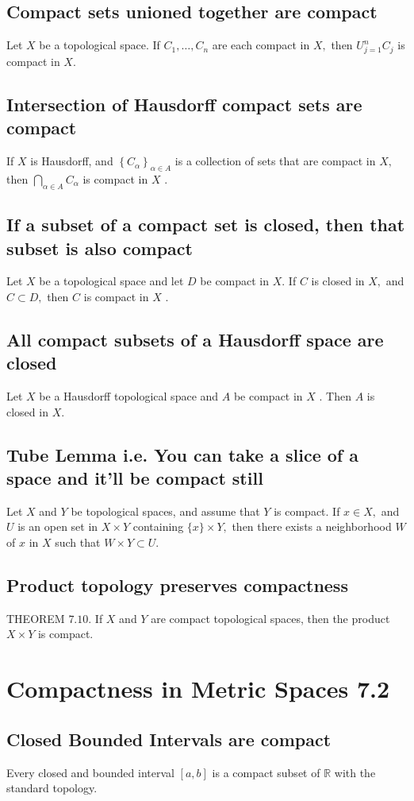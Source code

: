 \documentclass[12pt]{article}
\begin{document}
	\subsection{Compact sets unioned together are compact}
		Let $ X $ be a topological space. If $C _ { 1 } , \ldots , C _ { n }$ are each compact in $X ,$ then $U _ { j = 1 } ^ { n } C _ { j }$ is compact	in $X .$
	\subsection{Intersection of Hausdorff compact sets are compact}
		If $X$ is Hausdorff, and $\left\{ C _ { \alpha } \right\} _ { \alpha \in A }$ is a collection of sets that are	compact in $X ,$ then $\bigcap _ { \alpha \in A } C _ { \alpha }$ is compact in $X$ .
	\subsection{If a subset of a compact set is closed, then that subset is also compact}
		Let $X$ be a topological space and let $D$ be compact in $X $. If $C$ is closed in $X ,$ and $C \subset D ,$ then $C$ is compact in $X$ .
	\subsection{All compact subsets of a Hausdorff space are closed}
	 	Let $X$ be a Hausdorff topological space and $A$ be compact in $X$ . Then $A$ is closed in $X .$
	 \subsection{Tube Lemma i.e. You can take a slice of a space and it'll be compact still}
		 Let $X$ and $Y$ be topological spaces, and assume that $Y$ is compact. If $x \in X ,$ and $U$ is an open set in $X \times Y$ containing $\{ x \} \times Y ,$ then there exists a neighborhood $W$ of $x$ in $X$ such that $W \times Y \subset U$.
	\subsection{Product topology preserves compactness}
		THEOREM $7.10 .$ If $X$ and $Y$ are compact topological spaces, then the product $X \times Y$ is compact.
	\setcounter{section}{6}
\section{Compactness in Metric Spaces 7.2}
	\subsection{Closed Bounded Intervals are compact}
		Every closed and bounded interval $[ a , b ]$ is a compact subset of $\mathbb { R }$ with the standard topology.	
\end{document}
